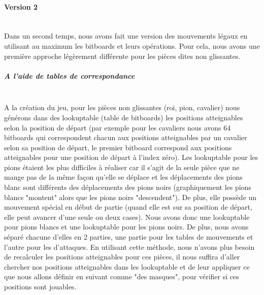 \documentclass{article}
\begin{document}
\paragraph{Version 2} \label{mouvements_legaux_v2}
~~\\
\newline
Dans un second temps, nous avons fait une version des mouvements légaux en utilisant au maximum les bitboards et leurs opérations.
Pour cela, nous avons une première approche légèrement différente pour les pièces dites non glissantes.
\subparagraph{A l'aide de tables de correspondance} \label{tables_de_correspondances}
~~\\
\newline
A la création du jeu, pour les pièces non glissantes (roi, pion, cavalier) nous générons dans des lookuptable (table de bitboards) les positions atteignables selon la position de départ (par exemple pour les cavaliers nous avons 64 bitboards qui correspondent chacun aux positions atteignables par un cavalier selon sa position de départ, le premier bitboard correspond aux positions atteignables pour une position de départ à l'index zéro).\newline
Les lookuptable pour les pions étaient les plus difficiles à réaliser car il s'agit de la seule pièce que ne mange pas de la même façon qu'elle se déplace et les déplacements des pions blanc sont différents des déplacements des pions noirs (graphiquement les pions blancs "montent" alors que les pions noirs "descendent"). \newline
De plus, elle possède un mouvement spécial en début de partie (quand elle est sur sa position de départ, elle peut avancer d'une seule ou deux cases).\newline
Nous avons donc une lookuptable pour pions blancs et une lookuptable pour les pions noirs.\newline
De plus, nous avons séparé chacune d'elles en 2 parties, une partie pour les tables de mouvements et l'autre pour les d'attaques.\newline
En utilisant cette méthode, nous n'avons plus besoin de recalculer les positions atteignables pour ces pièces, il nous suffira d'aller chercher nos positions atteignables dans les lookuptable et de leur appliquer ce que nous allons définir en suivant comme "des masques", pour vérifier si ces positions sont jouables.
\end{document}
